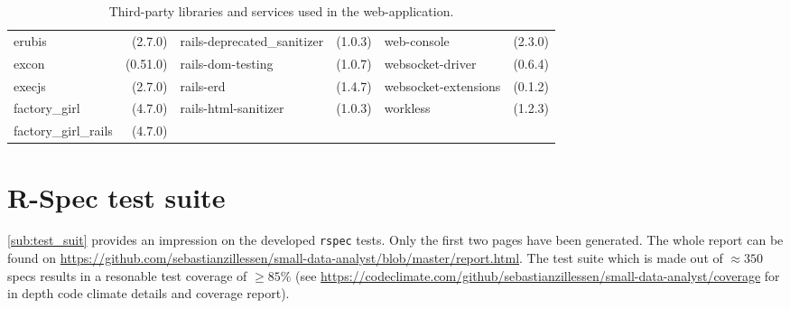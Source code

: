 \begin{table}[!h]
\begin{tabular}{|p{2.4cm}r||p{2.4cm}r||p{2.4cm}r|}
erubis&(2.7.0)&\tiny{rails-deprecated\_sanitizer}&(1.0.3)&web-console&(2.3.0)\\
excon&(0.51.0)&\tiny{rails-dom-testing}&(1.0.7)&\tiny{websocket-driver}&(0.6.4)\\
execjs&(2.7.0)&rails-erd&(1.4.7)&\tiny{websocket-extensions}&(0.1.2)\\
factory\_girl&(4.7.0)&\tiny{rails-html-sanitizer}&(1.0.3)&workless&(1.2.3)\\
factory\_girl\_rails&(4.7.0)&&&&\\
	\hline
	\end{tabular}
	\caption{Third-party libraries and services used in the web-application.}
	\label{tab:libs}
\end{table}

\clearpage
\newpage

\section{R-Spec test suite}
\label{app:d}
\label{app:rspec}
\sloppy
\autoref{sub:test_suit} provides an impression on the developed \texttt{rspec} tests. Only the first two pages have been generated. The whole report can be found on \href{https://github.com/sebastianzillessen/small-data-analyst/blob/master/report.html}{https://github.com/sebastianzillessen/small-data-analyst/blob/master/report.html}. The test suite which is made out of $\approx 350$ specs results in a resonable test coverage of $\geq 85\%$ (see \href{https://codeclimate.com/github/sebastianzillessen/small-data-analyst/coverage}{https://codeclimate.com/github/sebastianzillessen/small-data-analyst/coverage} for in depth code climate details and coverage report).
